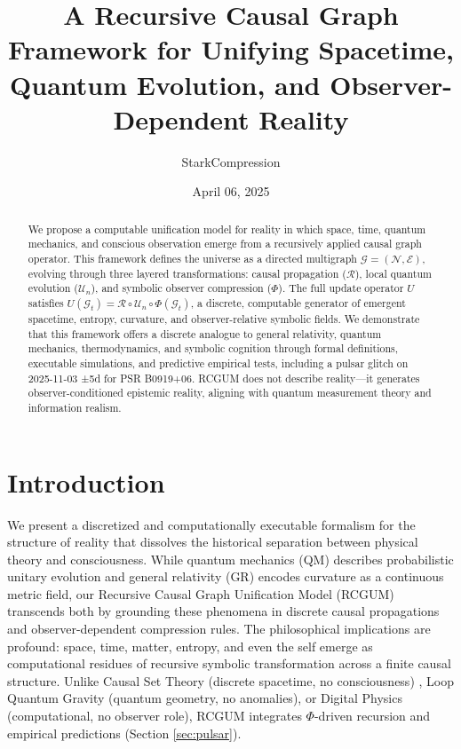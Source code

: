 \documentclass[11pt]{article}
\title{A Recursive Causal Graph Framework for Unifying Spacetime, Quantum Evolution, and Observer-Dependent Reality}
\author{StarkCompression}
\date{April 06, 2025}
\begin{document}
\maketitle

\begin{abstract}
We propose a computable unification model for reality in which space, time, quantum mechanics, and conscious observation emerge from a recursively applied causal graph operator. This framework defines the universe as a directed multigraph \( \mathcal{G} = (\mathcal{N}, \mathcal{E}) \), evolving through three layered transformations: causal propagation (\( \mathcal{R} \)), local quantum evolution (\( \mathcal{U}_n \)), and symbolic observer compression (\( \Phi \)). The full update operator \( U \) satisfies \( U(\mathcal{G}_t) = \mathcal{R} \circ \mathcal{U}_n \circ \Phi(\mathcal{G}_t) \), a discrete, computable generator of emergent spacetime, entropy, curvature, and observer-relative symbolic fields. We demonstrate that this framework offers a discrete analogue to general relativity, quantum mechanics, thermodynamics, and symbolic cognition through formal definitions, executable simulations, and predictive empirical tests, including a pulsar glitch on 2025-11-03 ±5d for PSR B0919+06. RCGUM does not describe reality—it generates observer-conditioned epistemic reality, aligning with quantum measurement theory and information realism.
\end{abstract}

\section{Introduction}
We present a discretized and computationally executable formalism for the structure of reality that dissolves the historical separation between physical theory and consciousness. While quantum mechanics (QM) describes probabilistic unitary evolution and general relativity (GR) encodes curvature as a continuous metric field, our Recursive Causal Graph Unification Model (RCGUM) transcends both by grounding these phenomena in discrete causal propagations and observer-dependent compression rules. The philosophical implications are profound: space, time, matter, entropy, and even the self emerge as computational residues of recursive symbolic transformation across a finite causal structure. Unlike Causal Set Theory (discrete spacetime, no consciousness) \citep{sorkin}, Loop Quantum Gravity (quantum geometry, no anomalies), or Digital Physics (computational, no observer role), RCGUM integrates \( \Phi \)-driven recursion and empirical predictions (Section \ref{sec:pulsar}).
\end{document}
